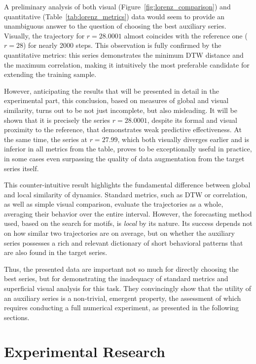 \documentclass[a4paper,12pt]{extarticle}
\begin{document}
A preliminary analysis of both visual (Figure~\ref{fig:lorenz_comparison})
 and quantitative (Table~\ref{tab:lorenz_metrics}) data would seem
  to provide an unambiguous answer to the question of choosing the best auxiliary
   series. Visually, the trajectory for $r=28.0001$ almost coincides with the reference one
    ($r=28$) for nearly 2000 steps. This observation is fully
     confirmed by the quantitative metrics: this series demonstrates the minimum
      DTW distance and the maximum correlation, making it intuitively the most
      preferable candidate for extending the training sample.

However, anticipating the results that will be presented in detail in the experimental
 part, this conclusion, based on measures of global and visual similarity, turns out to be not
 just incomplete, but also misleading. It will be shown that it is precisely the series $r=28.0001$,
 despite its formal and visual proximity to the reference, that demonstrates weak predictive
 effectiveness. At the same time, the series at $r=27.99$, which both visually diverges earlier and is inferior
  in all metrics from the table, proves to be exceptionally useful in practice,
  in some cases even surpassing the quality of data augmentation from the target series itself.

This counter-intuitive result highlights the fundamental difference between global
 and local similarity of dynamics. Standard metrics, such as DTW or correlation,
 as well as simple visual comparison, evaluate the trajectories as a whole, averaging their behavior
 over the entire interval. However, the forecasting method used, based on the search for motifs,
  is \textit{local} by its nature. Its success depends not on how similar two
  trajectories are on average, but on whether the auxiliary series possesses a rich and relevant
  dictionary of short behavioral patterns that are also found in the target series.

Thus, the presented data are important not so much for directly choosing the best series,
but for demonstrating the inadequacy of standard metrics and superficial visual
analysis for this task. They convincingly show that the utility of an auxiliary series
is a non-trivial, emergent property, the assessment of which requires conducting a full
numerical experiment, as presented in the following sections.
\section{Experimental Research}
\end{document}

